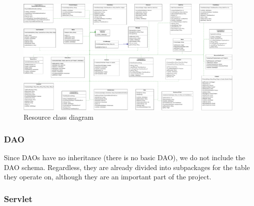 \begin{figure}
    \centering
    \includegraphics[width=1.1\textwidth,height=\textheight,keepaspectratio]{Schemas/resources.drawio.pdf}
    \caption{Resource class diagram}
    \label{fig:ResouceClassDiagram}
\end{figure}

\subsubsection*{DAO}

Since DAOs have no inheritance (there
is no basic DAO), we do not include the DAO schema.
Regardless, they are already divided into subpackages for the table they
operate on, although they are an important part of the project.


\subsubsection*{Servlet}

